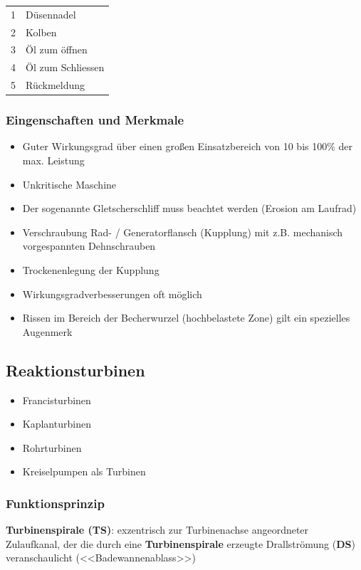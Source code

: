 \begin{tabular}{c l}
        1 & Düsennadel \\
        2 & Kolben \\
        3 & Öl zum öffnen \\
        4 & Öl zum Schliessen \\
        5 & Rückmeldung
\end{tabular}

\subsubsection{Eingenschaften und Merkmale}
\begin{itemize}
    \item Guter Wirkungsgrad über einen großen Einsatzbereich von 10 bis 100\% der max. Leistung
    \item Unkritische Maschine
    \item Der sogenannte Gletscherschliff muss beachtet werden (Erosion am Laufrad)
    \item Verschraubung Rad- / Generatorflansch (Kupplung) mit z.B. mechanisch vorgespannten Dehnschrauben
    \item Trockenenlegung der Kupplung
    \item Wirkungsgradverbesserungen oft möglich
    \item Rissen im Bereich der Becherwurzel (hochbelastete Zone) gilt ein spezielles Augenmerk
\end{itemize}



\subsection{Reaktionsturbinen}

\begin{itemize}
    \item Francisturbinen
    \item Kaplanturbinen
    \item Rohrturbinen
    \item Kreiselpumpen als Turbinen
\end{itemize}



\subsubsection{Funktionsprinzip}

\textbf{Turbinenspirale (TS)}: exzentrisch zur Turbinenachse angeordneter Zulaufkanal, der die durch eine \textbf{Turbinenspirale} erzeugte Drallströmung (\textbf{DS}) veranschaulicht (<<Badewannenablass>>)


